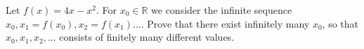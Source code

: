 Let $f(x) = 4x - x^2$. For $x_0 \in \mathbb{R}$ we consider the infinite sequence $x_0, x_1 = f(x_0), x_2 = f(x_1) \ldots$. Prove that there exist infinitely many $x_0$, so that $x_0, x_1, x_2, \ldots$ consists of finitely many different values.
